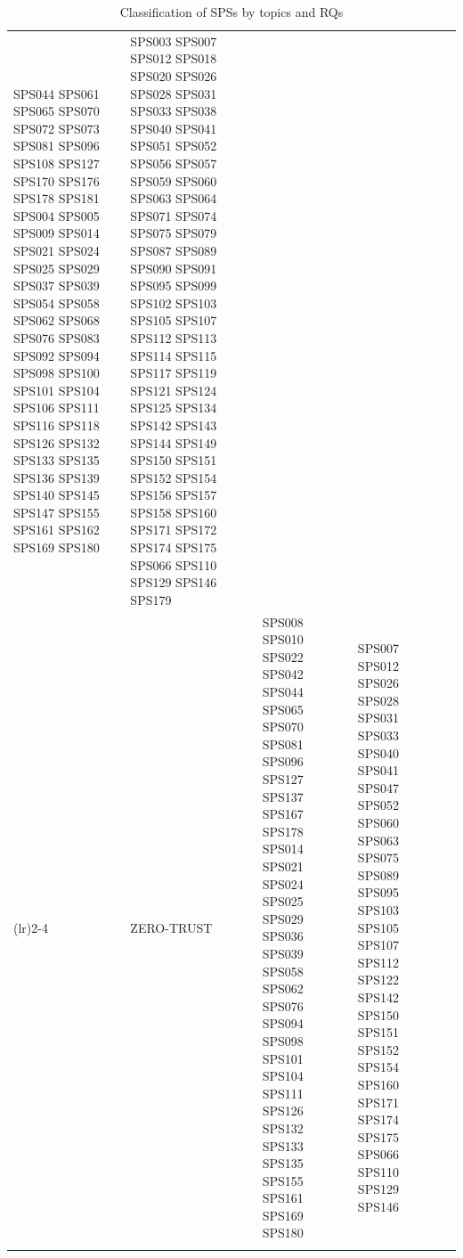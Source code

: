 \begin{table}[htbp]
\begin{tabularx}{\textwidth}{p{0.5cm}p{1.5cm}>{\raggedright\arraybackslash}X>{\raggedright\arraybackslash}X>{\raggedright\arraybackslash}X}
																		  SPS044 SPS061 SPS065 SPS070 SPS072 SPS073 
																		  SPS081 SPS096 SPS108 SPS127 SPS170 SPS176 
																		  SPS178 SPS181 SPS004 SPS005 SPS009 SPS014 
																		  SPS021 SPS024 SPS025 SPS029 SPS037 SPS039 
																		  SPS054 SPS058 SPS062 SPS068 SPS076 SPS083 
																		  SPS092 SPS094 SPS098 SPS100 SPS101 SPS104 
																		  SPS106 SPS111 SPS116 SPS118 SPS126 SPS132 
																		  SPS133 SPS135 SPS136 SPS139 SPS140 SPS145 
																		  SPS147 SPS155 SPS161 SPS162 SPS169 SPS180   & SPS003 SPS007 SPS012 SPS018 SPS020 SPS026 
																														SPS028 SPS031 SPS033 SPS038 SPS040 SPS041 
																														SPS051 SPS052 SPS056 SPS057 SPS059 SPS060 
																														SPS063 SPS064 SPS071 SPS074 SPS075 SPS079 
																														SPS087 SPS089 SPS090 SPS091 SPS095 SPS099 
																														SPS102 SPS103 SPS105 SPS107 SPS112 SPS113 
																														SPS114 SPS115 SPS117 SPS119 SPS121 SPS124 
																														SPS125 SPS134 SPS142 SPS143 SPS144 SPS149 
																														SPS150 SPS151 SPS152 SPS154 SPS156 SPS157 
																														SPS158 SPS160 SPS171 SPS172 SPS174 SPS175	
																														SPS066 SPS110 SPS129 SPS146 SPS179         \\
		\addlinespace[0.3em]
		\cmidrule(lr){2-4}
											  & ZERO-TRUST				& SPS008 SPS010 SPS022 SPS042 SPS044 SPS065 
																		  SPS070 SPS081 SPS096 SPS127 SPS137 SPS167 
																		  SPS178 SPS014 SPS021 SPS024 SPS025 SPS029 
																		  SPS036 SPS039 SPS058 SPS062 SPS076 SPS094 
																		  SPS098 SPS101 SPS104 SPS111 SPS126 SPS132 
																		  SPS133 SPS135 SPS155 SPS161 SPS169 SPS180	 & SPS007 SPS012 SPS026 SPS028 SPS031 SPS033 
																													   SPS040 SPS041 SPS047 SPS052 SPS060 SPS063 
																													   SPS075 SPS089 SPS095 SPS103 SPS105 SPS107 
																													   SPS112 SPS122 SPS142 SPS150 SPS151 SPS152 
																													   SPS154 SPS160 SPS171 SPS174 SPS175 SPS066 
																													   SPS110 SPS129 SPS146						 \\
	\bottomrule
	\vspace{2pt}
	\end{tabularx}
	\caption{Classification of SPSs by topics and RQs}\label{table:sps_classification_by_topic_rq}
\end{table}

